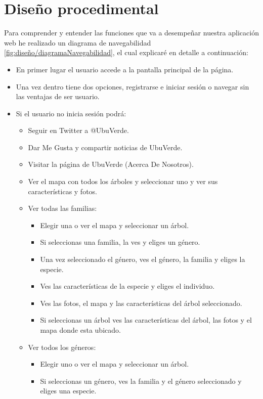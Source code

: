 \section{Diseño procedimental}

Para comprender y entender las funciones que va a desempeñar nuestra aplicación web he realizado un diagrama de navegabilidad \ref{fig:diseño/diagramaNavegabilidad}, el cual explicaré en detalle a continuación:

\begin{itemize}
	\item En primer lugar el usuario accede a la pantalla principal de la página.
	\item Una vez dentro tiene dos opciones, registrarse e iniciar sesión o navegar sin las ventajas de ser usuario.
	\item Si el usuario no inicia sesión podrá:
	\begin{itemize}
		\item Seguir en Twitter a @UbuVerde.
		\item Dar Me Gusta y compartir noticias de UbuVerde. 
		\item Visitar la página de UbuVerde (Acerca De Nosotros). 
		\item Ver el mapa con todos los árboles y seleccionar uno y ver sus características y fotos.
		\item Ver todas las familias:
		\begin{itemize}
			\item Elegir una o ver el mapa y seleccionar un árbol.
			\item Si seleccionas una familia, la ves y eliges un género.
			\item Una vez seleccionado el género, ves el género, la familia y eliges la especie.
			\item Ves las características de la especie y eliges el individuo.
			\item Ves las fotos, el mapa y las características del árbol seleccionado.
			\item Si seleccionas un árbol ves las características del árbol, las fotos y el mapa donde esta ubicado.
		\end{itemize} 
		\item Ver todos los géneros:
		\begin{itemize}
			\item Elegir uno o ver el mapa y seleccionar un árbol.
			\item Si seleccionas un género, ves la familia y el género seleccionado y eliges una especie.

\end{itemize}
\end{itemize}
\end{itemize}
